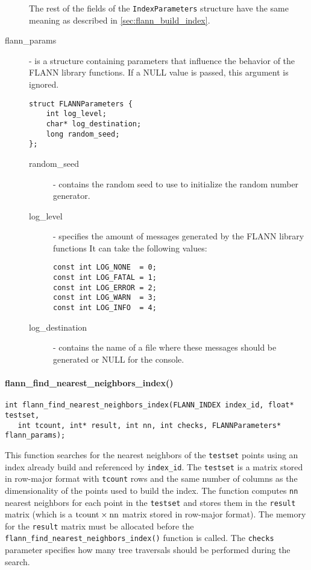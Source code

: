 \documentclass[letter,10pt]{article}
\begin{document}
\begin{description}
The rest of the fields of the \texttt{IndexParameters} structure have the
same meaning as described in \ref{sec:flann_build_index}.

\item [flann\_params] - is a structure containing parameters that influence the
behavior of the FLANN library functions. If a NULL value is passed, this
argument is ignored.
\begin{Verbatim}[fontsize=\footnotesize]
struct FLANNParameters {
    int log_level;
    char* log_destination;
    long random_seed;
};
\end{Verbatim}

\begin{description}
\item [random\_seed] - contains the random seed to use to initialize the random
number generator.
 \item[log\_level] - specifies the amount of messages generated by the FLANN
library functions It can take the following values:
\begin{Verbatim}[fontsize=\footnotesize]
const int LOG_NONE  = 0;
const int LOG_FATAL = 1;
const int LOG_ERROR = 2;
const int LOG_WARN  = 3;
const int LOG_INFO  = 4;
\end{Verbatim}
\item [log\_destination] - contains the name of a file where these messages
should be generated or NULL for the console.
\end{description}
\end{description}


\paragraph{flann\_find\_nearest\_neighbors\_index()}
\begin{Verbatim}[fontsize=\footnotesize,frame=single]
int flann_find_nearest_neighbors_index(FLANN_INDEX index_id, float* testset, 
   int tcount, int* result, int nn, int checks, FLANNParameters* flann_params);
\end{Verbatim}
This function searches for the nearest neighbors of the
\texttt{testset} points using an index already build and referenced by
\texttt{index\_id}. The \texttt{testset} is a matrix stored in row-major format
with \texttt{tcount} rows and the same number of columns as the dimensionality
of the points used to build the index. The function computes \texttt{nn}
nearest neighbors for each point in the \texttt{testset} and stores them in the
\texttt{result} matrix (which is a $\rm{tcount} \times \rm{nn}$ matrix stored in
row-major format). The memory for the \texttt{result} matrix must be allocated
before the \texttt{flann\_find\_nearest\_neighbors\_index()} function is
called. The \texttt{checks} parameter specifies how many tree traversals should
be performed during the search.
\end{document}
